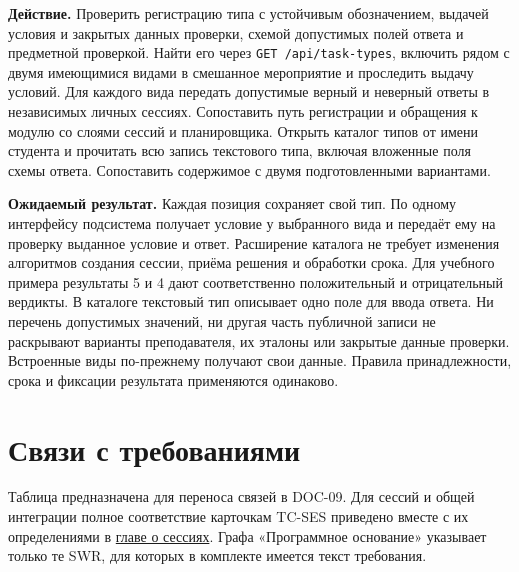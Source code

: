 \documentclass[12pt,a4paper]{article}
\begin{document}
\textbf{Действие.} Проверить регистрацию типа с устойчивым обозначением, выдачей условия и закрытых данных проверки, схемой допустимых полей ответа и предметной проверкой. Найти его через \texttt{GET /\allowbreak{}api/\allowbreak{}task-\allowbreak{}types}, включить рядом с двумя имеющимися видами в смешанное мероприятие и проследить выдачу условий. Для каждого вида передать допустимые верный и неверный ответы в независимых личных сессиях. Сопоставить путь регистрации и обращения к модулю со слоями сессий и планировщика. Открыть каталог типов от имени студента и прочитать всю запись текстового типа, включая вложенные поля схемы ответа. Сопоставить содержимое с двумя подготовленными вариантами.

\textbf{Ожидаемый результат.} Каждая позиция сохраняет свой тип. По одному интерфейсу подсистема получает условие у выбранного вида и передаёт ему на проверку выданное условие и ответ. Расширение каталога не требует изменения алгоритмов создания сессии, приёма решения и обработки срока. Для учебного примера результаты 5 и 4 дают соответственно положительный и отрицательный вердикты. В каталоге текстовый тип описывает одно поле для ввода ответа. Ни перечень допустимых значений, ни другая часть публичной записи не раскрывают варианты преподавателя, их эталоны или закрытые данные проверки. Встроенные виды по-прежнему получают свои данные. Правила принадлежности, срока и фиксации результата применяются одинаково.

\section{Связи с требованиями}\label{ux441ux432ux44fux437ux438-ux441-ux442ux440ux435ux431ux43eux432ux430ux43dux438ux44fux43cux438}

\hypertarget{связи-с-требованиями}{}

Таблица предназначена для переноса связей в DOC-09. Для сессий и общей интеграции полное соответствие карточкам TC-SES приведено вместе с их определениями в {\hyperlink{doc-10-верификация-сессий-задач-и-планировщика}{главе о сессиях}}. Графа «Программное основание» указывает только те SWR, для которых в комплекте имеется текст требования.
\end{document}
